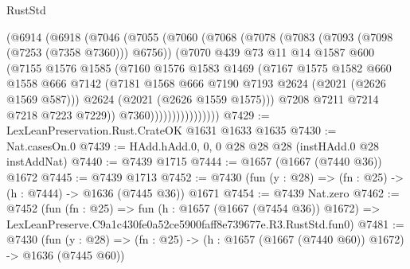 \begin{lexlean}{RustStd}
\begin{coremodule}
                    (@6914
                      (@6918
                        (@7046
                          (@7055
                            (@7060
                              (@7068
                                (@7078
                                  (@7083 (@7093 (@7098 (@7253 (@7358 @7360))) @6756))
                                  (@7070
                                    @439
                                    @73
                                    @11
                                    @14
                                    @1587
                                    @600
                                    (@7155
                                      @1576
                                      @1585
                                      (@7160
                                        @1576
                                        @1583
                                        @1469
                                        (@7167
                                          @1575
                                          @1582
                                          @660
                                          @1558
                                          @666
                                          @7142
                                          (@7181
                                            @1568
                                            @666
                                            @7190
                                            @7193
                                            @2624
                                            (@2021 (@2626 @1569 @587)))
                                          @2624
                                          (@2021 (@2626 @1559 @1575)))
                                        @7208
                                        @7211
                                        @7214
                                        @7218
                                        @7223
                                        @7229))
                                    @7360))))))))))))))))
@7429 := LexLeanPreservation.Rust.CrateOK @1631 @1633 @1635
@7430 := Nat.casesOn.{0}
@7439 := HAdd.hAdd.{0, 0, 0} @28 @28 @28 (instHAdd.{0} @28 instAddNat)
@7440 := @7439 @1715
@7444 := @1657 (@1667 (@7440 @36)) @1672
@7445 := @7439 @1713
@7452 := @7430 (fun (y : @28) => (fn : @25) -> (h : @7444) -> @1636 (@7445 @36)) @1671
@7454 := @7439 Nat.zero
@7462 := @7452
    (fun (fn : @25) =>
    fun (h : @1657 (@1667 (@7454 @36)) @1672) =>
    LexLeanPreserve.C9a1c430fe0a52ce5900faff8e739677e.R3.RustStd.fun0)
@7481 := @7430
    (fun (y : @28) => (fn : @25) -> (h : @1657 (@1667 (@7440 @60)) @1672) -> @1636 (@7445 @60))

\end{coremodule}
\end{lexlean}
